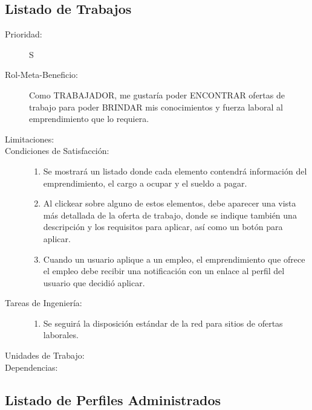 \newpage


\subsection{Listado de Trabajos}

\begin{description}
    \item[Prioridad:] S
    \item[Rol-Meta-Beneficio:] Como TRABAJADOR, me gustaría poder ENCONTRAR ofertas de trabajo para poder BRINDAR mis conocimientos y fuerza laboral al emprendimiento que lo requiera.
    \item[Limitaciones:] 
    \item[Condiciones de Satisfacción:]  \hfill
        \begin{enumerate}
            \item Se mostrará un listado donde cada elemento contendrá información del emprendimiento, el cargo a ocupar y el sueldo a pagar.
    		\item Al clickear sobre alguno de estos elementos, debe aparecer una vista más detallada de la oferta de trabajo, donde se indique también una descripción y los requisitos para aplicar, así como un botón para aplicar.
    		\item Cuando un usuario aplique a un empleo, el emprendimiento que ofrece el empleo debe recibir una notificación con un enlace al perfil del usuario que decidió aplicar.
        \end{enumerate}
    \item[Tareas de Ingeniería:]  \hfill
        \begin{enumerate}
            \item Se seguirá la disposición estándar de la red para sitios de ofertas laborales.
        \end{enumerate}
    \item[Unidades de Trabajo:]
    \item[Dependencias:]
\end{description}

\newpage


\subsection{Listado de Perfiles Administrados}


